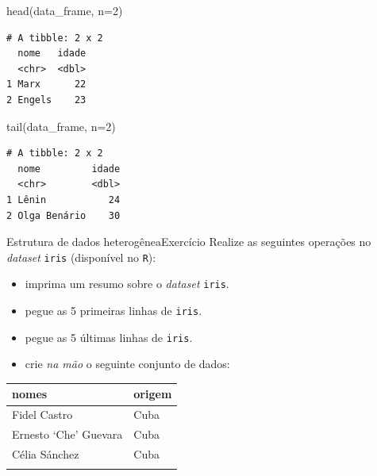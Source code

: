 \documentclass[
  10pt,
  ignorenonframetext,
]{beamer}
\newenvironment{Shaded}{\begin{snugshade}}{\end{snugshade}}
\newcommand{\AttributeTok}[1]{\textcolor[rgb]{0.40,0.45,0.13}{#1}}
\newcommand{\DecValTok}[1]{\textcolor[rgb]{0.68,0.00,0.00}{#1}}
\newcommand{\FunctionTok}[1]{\textcolor[rgb]{0.28,0.35,0.67}{#1}}
\newcommand{\NormalTok}[1]{\textcolor[rgb]{0.00,0.23,0.31}{#1}}
\providecommand{\tightlist}{%
  \setlength{\itemsep}{0pt}\setlength{\parskip}{0pt}}\usepackage{longtable,booktabs,array}
\begin{document}
\begin{frame}[fragile]
\begin{Shaded}
\begin{Highlighting}[]
\FunctionTok{head}\NormalTok{(data\_frame, }\AttributeTok{n=}\DecValTok{2}\NormalTok{)}
\end{Highlighting}
\end{Shaded}

\begin{verbatim}
# A tibble: 2 x 2
  nome   idade
  <chr>  <dbl>
1 Marx      22
2 Engels    23
\end{verbatim}

\begin{Shaded}
\begin{Highlighting}[]
\FunctionTok{tail}\NormalTok{(data\_frame, }\AttributeTok{n=}\DecValTok{2}\NormalTok{)}
\end{Highlighting}
\end{Shaded}

\begin{verbatim}
# A tibble: 2 x 2
  nome         idade
  <chr>        <dbl>
1 Lênin           24
2 Olga Benário    30
\end{verbatim}
\end{frame}

\begin{frame}[fragile]{Estrutura de dados heterogênea\newline Exercício}
\protect\hypertarget{estrutura-de-dados-heteroguxeaneaexercuxedcio-2}{}
Realize as seguintes operações no \emph{dataset} \texttt{iris}
(disponível no \texttt{R}):

\begin{itemize}
\tightlist
\item
  imprima um resumo sobre o \emph{dataset} \texttt{iris}.
\item
  pegue as 5 primeiras linhas de \texttt{iris}.
\item
  pegue as 5 últimas linhas de \texttt{iris}.
\item
  crie \emph{na mão} o seguinte conjunto de dados:
\end{itemize}

\begin{longtable}[]{@{}ll@{}}
\toprule\noalign{}
nomes & origem \\
\midrule\noalign{}
\endhead
Fidel Castro & Cuba \\
Ernesto `Che' Guevara & Cuba \\
Célia Sánchez & Cuba \\
\bottomrule\noalign{}
\end{longtable}
\end{frame}
\end{document}
